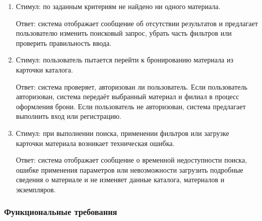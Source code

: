 \documentclass[12pt,a4paper]{article}
\begin{document}
\begin{enumerate}
		\item Стимул: по заданным критериям не найдено ни одного материала.
		
		Ответ: система отображает сообщение об отсутствии результатов и предлагает
		пользователю изменить поисковый запрос, убрать часть фильтров или проверить
		правильность ввода.
		
		\item Стимул: пользователь пытается перейти к бронированию материала из карточки
		каталога.
		
		Ответ: система проверяет, авторизован ли пользователь. Если пользователь
		авторизован, система передаёт выбранный материал и филиал в процесс оформления
		брони. Если пользователь не авторизован, система предлагает выполнить вход
		или регистрацию.
		
		\item Стимул: при выполнении поиска, применении фильтров или загрузке карточки
		материала возникает техническая ошибка.
		
		Ответ: система отображает сообщение о временной недоступности поиска,
		ошибке применения параметров или невозможности загрузить подробные сведения
		о материале и не изменяет данные каталога, материалов и экземпляров.
	\end{enumerate}
	
	\subsubsection{Функциональные требования}
	
\end{document}
